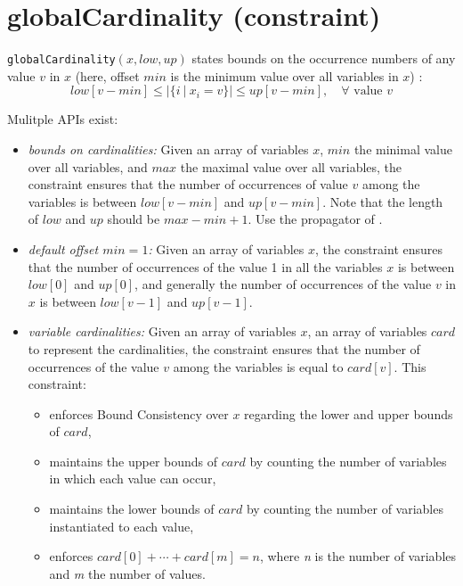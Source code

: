 \label{globalcardinality}
\hypertarget{globalcardinality}{}

\section{globalCardinality (constraint)}\label{globalcardinality:globalcardinalityconstraint}\hypertarget{globalcardinality:globalcardinalityconstraint}{}
\begin{notedef}
  \texttt{globalCardinality}$(x,low, up)$ states bounds on the occurrence numbers of any value $v$ in $x$ (here, offset $min$ is the minimum value over all variables in $x$) :
$$low[v-min]\le|\{i\ |\ x_i=v\}|\le up[v-min],\quad\forall \text{ value } v$$   
\end{notedef}

Mulitple APIs exist:
\begin{itemize}
	\item \emph{bounds on cardinalities:} Given an array of variables $x$, $min$ the minimal value over all variables, and $max$ the maximal value over all variables, the constraint ensures that the number of occurrences of value $v$ among the variables is between $low[v-min]$ and $up[v-min]$. Note that the length of $low$ and $up$ should be $max - min + 1$. Use the propagator of \cite{QuimperCP03}.
	\item \emph{default offset $min=1$:} Given an array of variables $x$, the constraint ensures that the number of occurrences of the value 1 in all the variables $x$ is between $low[0]$ and $up[0]$, and generally the number of occurrences of the value $v$ in $x$ is between $low[v-1]$ and $up[v-1]$.
	\item \emph{variable cardinalities:} Given an array of variables $x$, an array of variables $card$ to represent the cardinalities, the constraint ensures that the number of occurrences of the value $v$ among the variables is equal to $card[v]$. This constraint:
      \begin{itemize}
      \item enforces Bound Consistency over $x$ regarding the lower and upper bounds of $card$, 
      \item maintains the upper bounds of $card$ by counting the number of variables in which each value can occur, 
      \item maintains the lower bounds of $card$ by counting the number of variables instantiated to each value, 
      \item enforces $card[0] + \cdots + card[m] = n$, where \emph{n} is the number of variables and \emph{m} the number of values.
      \end{itemize}

\end{itemize}

